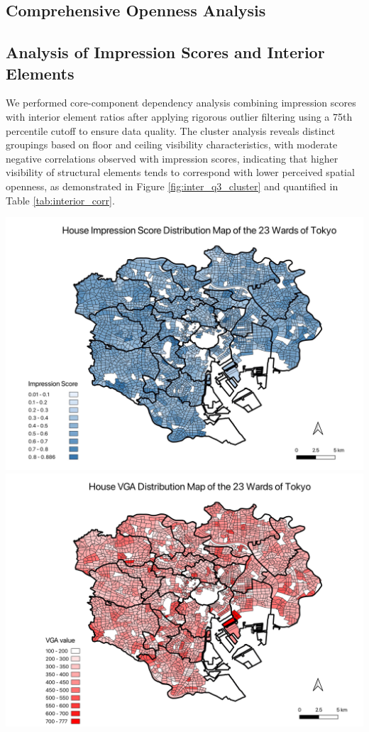 \documentclass[11pt,a4paper]{article}
\begin{document}
\begin{multicols}{2}
\section{Comprehensive Openness Analysis}
\subsection{Analysis of Impression Scores and Interior Elements}
We performed core-component dependency analysis combining impression scores 
with interior element ratios after applying rigorous outlier filtering using a 75th percentile cutoff to ensure data quality. The cluster analysis reveals distinct 
groupings based on floor and ceiling visibility characteristics, with moderate negative correlations observed with impression scores, indicating that higher visibility of structural elements tends to correspond with lower perceived spatial openness, 
as demonstrated in Figure \ref{fig:inter_q3_cluster} and quantified in Table \ref{tab:interior_corr}.

\begin{center}
    \includegraphics[width=0.8\columnwidth]{plots/tokyo23_q3_geo.jpg}
    \\[0.5em]
    \includegraphics[width=0.8\columnwidth]{plots/tokyo23_vga_geo.png}
    \label{fig:geo_analysis}
\end{center}


\end{multicols}
\end{document}

